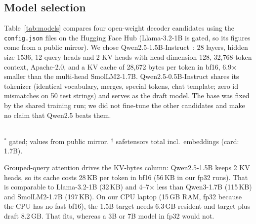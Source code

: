 \subsection{Model selection}
\label{sec:model}
Table~\ref{tab:models} compares four open-weight decoder candidates using the \texttt{config.json} files on the Hugging Face Hub (Llama-3.2-1B is gated, so its figures come from a public mirror). We chose Qwen2.5-1.5B-Instruct~\cite{qwen2024qwen25}: 28 layers, hidden size 1536, 12 query heads and 2 KV heads with head dimension 128, 32{,}768-token context, Apache-2.0, and a KV cache of 28{,}672 bytes per token in bf16, 6.9$\times$ smaller than the multi-head SmolLM2-1.7B. Qwen2.5-0.5B-Instruct shares its tokenizer (identical vocabulary, merges, special tokens, chat template; zero id mismatches on 50 test strings) and serves as the draft model. The base was fixed by the shared training run; we did not fine-tune the other candidates and make no claim that Qwen2.5 beats them.
\begin{table}[t]
\caption{Candidate open decoder models (config.json; memory by arithmetic, GiB).}
\label{tab:models}
\centering\scriptsize
{}\\[2pt]
{\scriptsize $^{\ast}$ gated; values from public mirror. $^{\dagger}$ safetensors total incl.\ embeddings (card: 1.7B).}
\end{table}
Grouped-query attention drives the KV-bytes column: Qwen2.5-1.5B keeps 2 KV heads, so its cache costs 28\,KB per token in bf16 (56\,KB in our fp32 runs). That is comparable to Llama-3.2-1B (32\,KB) and 4--7$\times$ less than Qwen3-1.7B (115\,KB) and SmolLM2-1.7B (197\,KB). On our CPU laptop (15\,GB RAM, fp32 because the CPU has no fast bf16), the 1.5B target needs 6.3\,GB resident and target plus draft 8.2\,GB. That fits, whereas a 3B or 7B model in fp32 would not.

